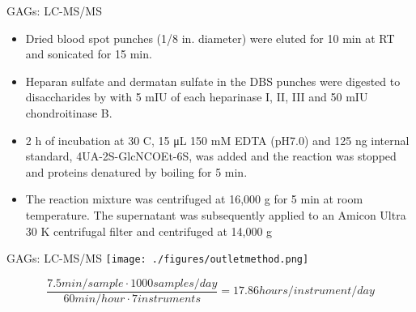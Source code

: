 \documentclass[presentation, smaller]{beamer}
\begin{document}
\begin{frame}[label={sec:orgheadline10}]{GAGs: LC-MS/MS}
\begin{itemize}
\item Dried blood spot punches (1/8 in. diameter) were eluted for 10 min at RT and sonicated for 15 min.
\item Heparan sulfate and dermatan sulfate in the DBS punches were
digested to disaccharides by with 5 mIU of each heparinase I, II,
III and 50 mIU chondroitinase B.
\item 2 h of incubation at 30 \degree{} C, 15 μL 150 mM EDTA (pH7.0) and
125 ng internal standard, 4UA-2S-GlcNCOEt-6S, was added and the
reaction was stopped and proteins denatured by boiling for 5 min.
\item The reaction mixture was centrifuged at 16,000 g for 5 min at room
temperature. The supernatant was subsequently applied to an Amicon
Ultra 30 K centrifugal filter and centrifuged at 14,000 g
\end{itemize}
\end{frame}

\begin{frame}[label={sec:orgheadline11}]{GAGs: LC-MS/MS}
\texttt{[image: ./figures/outletmethod.png]}


\[
\frac{7.5 min/sample \cdot 1000 samples/day}{60 min/hour \cdot 7 instruments}
= 17.86 hours/instrument/day
\]
\end{frame}
\end{document}
